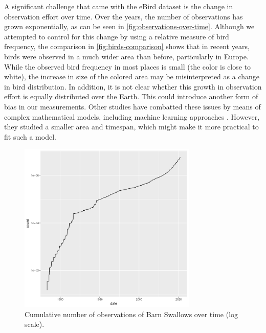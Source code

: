 \documentclass[journal]{vgtc}                %
\begin{document}
A significant challenge that came with the eBird dataset is the change in observation effort over time. Over the years, the number of observations has grown exponentially, as can be seen in \autoref{fig:observations-over-time}. Although we attempted to control for this change by using a relative measure of bird frequency, the comparison in \autoref{fig:birds-comparison} shows that in recent years, birds were observed in a much wider area than before, particularly in Europe. While the observed bird frequency in most places is small (the color is close to white), the increase in size of the colored area may be misinterpreted as a change in bird distribution. In addition, it is not clear whether this growth in observation effort is equally distributed over the Earth. This could introduce another form of bias in our measurements. Other studies have combatted these issues by means of complex mathematical models, including machine learning approaches \cite{johnston2019best,johnston2020analytical}. However, they studied a smaller area and timespan, which might make it more practical to fit such a model.

\begin{figure}[h]
  \centering
  \includegraphics[width=85mm]{observations-over-time}
  \caption{Cumulative number of observations of Barn Swallows over time (log scale).}
  \label{fig:observations-over-time}
\end{figure}
\end{document}
